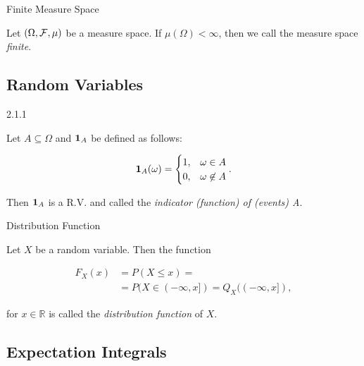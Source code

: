 \begin{definition}{}{Finite Measure Space}

    Let $(\Omega, \mathcal{F}, \mu)$ be a measure space. If $\mu(\Omega) < \infty$, then we call the measure space \emph{finite}.

\end{definition}


\subsection{Random Variables}

\begin{definition}{2.1.1}{}

    Let $A \subseteq \Omega$ and $\mathbf{1}_{A}$ be defined as follows:

        \begin{align*}
            \mathbf{1}_{A}(\omega) =
            \begin{cases}
                1, & \omega \in A \\
                0, & \omega \not\in A
            \end{cases}.
        \end{align*}

    Then $\mathbf{1}_{A}$ is a R.V. and called the \emph{indicator (function) of (events) A}.

\end{definition}

\begin{definition}{2.3}{Distribution Function}

    Let $X$ be a random variable. Then the function

        \begin{align*}
            F_X(x) &= P(X \leq x) = \\ &= P(X \in (-\infty, x]) = Q_X((-\infty, x]),
        \end{align*}

    for $x \in \mathbb{R}$ is called the \emph{distribution function} of $X$.

\end{definition}


\subsection{Expectation Integrals}

